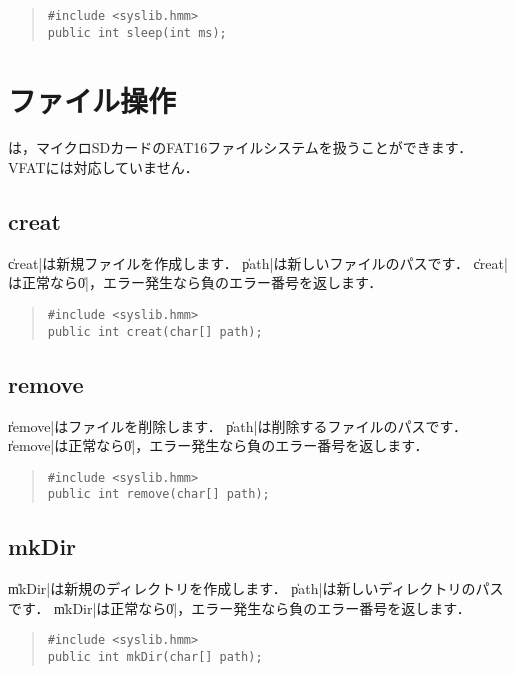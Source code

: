 \begin{quote}
\begin{verbatim}
#include <syslib.hmm>
public int sleep(int ms);
\end{verbatim}
\end{quote}

\section{ファイル操作}

\tacos は，マイクロSDカードのFAT16ファイルシステムを扱うことができます．
VFATには対応していません．

\subsection{creat}

\|creat|は新規ファイルを作成します．
\|path|は新しいファイルのパスです．
\|creat|は正常なら\|0|，エラー発生なら負のエラー番号を返します．

\begin{quote}
\begin{verbatim}
#include <syslib.hmm>
public int creat(char[] path);
\end{verbatim}
\end{quote}

\subsection{remove}

\|remove|はファイルを削除します．
\|path|は削除するファイルのパスです．
\|remove|は正常なら\|0|，エラー発生なら負のエラー番号を返します．

\begin{quote}
\begin{verbatim}
#include <syslib.hmm>
public int remove(char[] path);
\end{verbatim}
\end{quote}

\subsection{mkDir}

\|mkDir|は新規のディレクトリを作成します．
\|path|は新しいディレクトリのパスです．
\|mkDir|は正常なら\|0|，エラー発生なら負のエラー番号を返します．

\begin{quote}
\begin{verbatim}
#include <syslib.hmm>
public int mkDir(char[] path);
\end{verbatim}
\end{quote}

